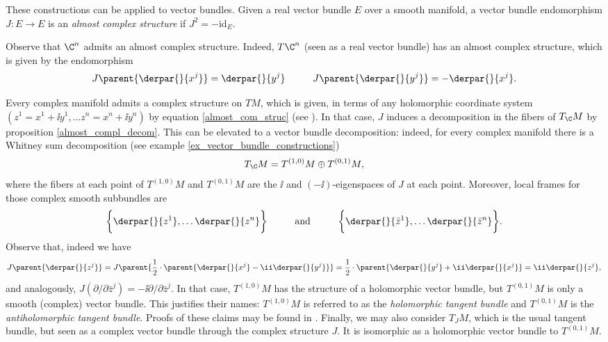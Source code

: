 These constructions can be applied to vector bundles. Given a real vector bundle \(E\) over a smooth manifold, a vector bundle endomorphism \(J \colon E \to E\) is an \textit{almost complex structure} if \(J^2=-\mathrm{id}_E\).

\begin{obs}
    Observe that \(\C^n\) admits an almost complex structure. Indeed, \(T\C^n\) (seen as a real vector bundle) has an almost complex structure, which is given by the endomorphism
    \begin{equation} \label{almost_com_struc}
    J\parent{\derpar{}{x^j}}=\derpar{}{y^j} \hspace{1 cm} J\parent{\derpar{}{y^j}}=-\derpar{}{x^j}.
    \end{equation}
\end{obs}
Every complex manifold admits a complex structure on \(TM\), which is given, in terms of any holomorphic coordinate system \((z^1=x^1+\ii y^1, \ldots z^n=x^n+\ii y^n)\) by equation \eqref{almost_com_struc} (see \parencite[Prop. 1.55]{lee_introCM}). In that case, \(J\) induces a decomposition in the fibers of \(T_\C M\) by proposition \ref{almost_compl_decom}. This can be elevated to a vector bundle decomposition: indeed, for every complex manifold there is a Whitney sum decomposition (see example \ref{ex_vector_bundle_constructions})
\begin{equation} \label{decomp_T_CM}
T_\C M= T^{(1,0)}M \oplus T^{(0,1)}M,
\end{equation}
where the fibers at each point of \( T^{(1,0)}M\) and \(T^{(0,1)}M\) are the \(\ii\) and \((-\ii)\)-eigenspaces of \(J\) at each point. Moreover, local frames for those complex smooth subbundles are
\[
\bigg\lbrace \derpar{}{z^1}, \ldots \derpar{}{z^n} \bigg\rbrace \hspace{1 cm} \text{and} \hspace{1 cm}
\bigg\lbrace \derpar{}{\bar z^1}, \ldots \derpar{}{\bar z^n} \bigg\rbrace.
\]
Observe that, indeed we have
\[
J\parent{\derpar{}{z^j}}=J\parent{\frac{1}{2}\cdot \parent{\derpar{}{x^j}-\ii \derpar{}{y^j}}}=\frac{1}{2}\cdot \parent{\derpar{}{y^j}+\ii\derpar{}{x^j}}=\ii \derpar{}{z^j},
\]
and analogously, \(J(\partial/\partial \bar{z}^j)=-\ii \partial/\partial \bar{z}^j\). In that case, \(T^{(1,0)}M\) has the structure of a holomorphic vector bundle, but \(T^{(0,1)}M\) is only a smooth (complex) vector bundle. This justifies their names: \(T^{(1,0)}M\) is referred to as the \textit{holomorphic tangent bundle} and \(T^{(0,1)}M\) is the \textit{antiholomorphic tangent bundle}. Proofs of these claims may be found in \parencite[Prop. 156 and Example 3.37]{lee_introCM}. Finally, we may also consider \(T_JM\), which is the usual tangent bundle, but seen as a complex vector bundle through the complex structure \(J\). It is isomorphic as a holomorphic vector bundle to \(T^{(0,1)}M\).

